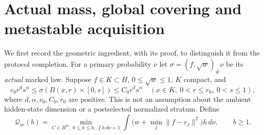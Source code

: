 \section{Actual mass, global covering and metastable acquisition}
\label{sec:geometry}
We first record the geometric ingredient, with its proof, to distinguish it from the protocol completion. For a primary probability $\nu$ let $\sigma=(f,\sqrt w)_\#\nu$ be its \emph{actual} marked law. Suppose $f\in K\subset H$, $0\le\sqrt w\le1$, $K$ compact, and
\begin{equation}\label{eq:rectangles}
 c_0r^ds^\alpha\le\sigma(B(x,r)\times[0,s])\le C_0r^ds^\alpha
 \quad(x\in K,\ 0<r\le r_0,\ 0<s\le1),
\end{equation}
where $d,\alpha,c_0,C_0,r_0$ are positive. This is not an assumption about the ambient hidden-state dimension or a postselected normalized stratum. Define
\[
 \mathcal Q_m(b)=\min_{C\in H^m,\ 0\le h\le b,\ \int h\,d\nu=1}
     \int\bigl(w+\min_j\|f-r_j\|^2\bigr)h\,d\nu,
 \qquad b\ge1.
\]

